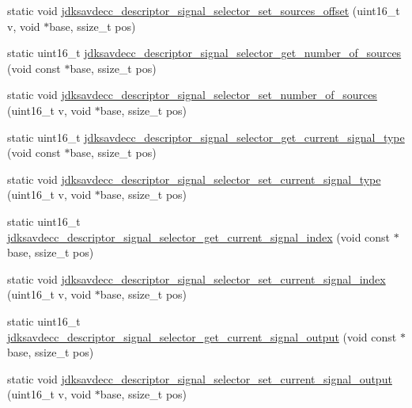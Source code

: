 \begin{DoxyCompactItemize}
\item 
static void \hyperlink{group__descriptor__signal__selector_ga75088bdf711488518319deec07bc1b31}{jdksavdecc\+\_\+descriptor\+\_\+signal\+\_\+selector\+\_\+set\+\_\+sources\+\_\+offset} (uint16\+\_\+t v, void $\ast$base, ssize\+\_\+t pos)
\item 
static uint16\+\_\+t \hyperlink{group__descriptor__signal__selector_gae7313a6d5229e6cfb3e6ba762406345c}{jdksavdecc\+\_\+descriptor\+\_\+signal\+\_\+selector\+\_\+get\+\_\+number\+\_\+of\+\_\+sources} (void const $\ast$base, ssize\+\_\+t pos)
\item 
static void \hyperlink{group__descriptor__signal__selector_ga47a775312ce13802763add529a785013}{jdksavdecc\+\_\+descriptor\+\_\+signal\+\_\+selector\+\_\+set\+\_\+number\+\_\+of\+\_\+sources} (uint16\+\_\+t v, void $\ast$base, ssize\+\_\+t pos)
\item 
static uint16\+\_\+t \hyperlink{group__descriptor__signal__selector_ga0f44d9066448c3a92a8023ad16be049d}{jdksavdecc\+\_\+descriptor\+\_\+signal\+\_\+selector\+\_\+get\+\_\+current\+\_\+signal\+\_\+type} (void const $\ast$base, ssize\+\_\+t pos)
\item 
static void \hyperlink{group__descriptor__signal__selector_ga4d4b21799573f0c459e060af4455e73b}{jdksavdecc\+\_\+descriptor\+\_\+signal\+\_\+selector\+\_\+set\+\_\+current\+\_\+signal\+\_\+type} (uint16\+\_\+t v, void $\ast$base, ssize\+\_\+t pos)
\item 
static uint16\+\_\+t \hyperlink{group__descriptor__signal__selector_ga5da66074e86891063e85fca5e7ed6d19}{jdksavdecc\+\_\+descriptor\+\_\+signal\+\_\+selector\+\_\+get\+\_\+current\+\_\+signal\+\_\+index} (void const $\ast$base, ssize\+\_\+t pos)
\item 
static void \hyperlink{group__descriptor__signal__selector_ga496cd6a6f15472a803fb8eb97eb9b668}{jdksavdecc\+\_\+descriptor\+\_\+signal\+\_\+selector\+\_\+set\+\_\+current\+\_\+signal\+\_\+index} (uint16\+\_\+t v, void $\ast$base, ssize\+\_\+t pos)
\item 
static uint16\+\_\+t \hyperlink{group__descriptor__signal__selector_ga9ebddda11cb06f75f581739a793a1fef}{jdksavdecc\+\_\+descriptor\+\_\+signal\+\_\+selector\+\_\+get\+\_\+current\+\_\+signal\+\_\+output} (void const $\ast$base, ssize\+\_\+t pos)
\item 
static void \hyperlink{group__descriptor__signal__selector_gaf007dc407a2fd4153738ea1b246bce95}{jdksavdecc\+\_\+descriptor\+\_\+signal\+\_\+selector\+\_\+set\+\_\+current\+\_\+signal\+\_\+output} (uint16\+\_\+t v, void $\ast$base, ssize\+\_\+t pos)

\end{DoxyCompactItemize}
